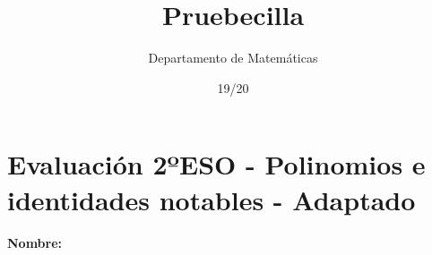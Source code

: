 \documentclass[palatino,nochap]{Docencia}
\title{Pruebecilla}
\author{Departamento de Matemáticas}
\date{19/20}
\begin{document}
\pagestyle{plain}

\section{Evaluación 2ºESO - Polinomios e identidades notables - Adaptado}

\paragraph{Nombre: }


\end{document}
